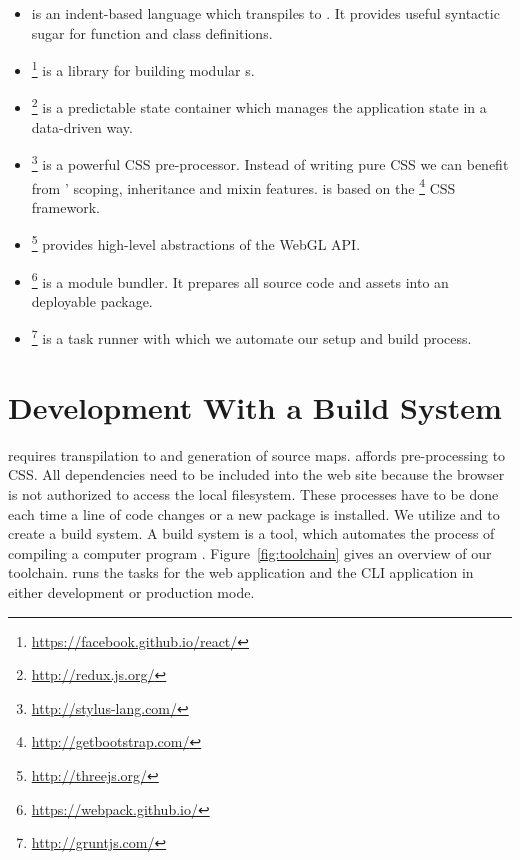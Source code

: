\documentclass[../ClassicThesis.tex]{subfiles}
\begin{document}
\begin{itemize}
\item {\coffeescript} is an indent-based language which
  transpiles to {\javascript}. It provides useful syntactic
  sugar for function and class definitions.

\item
  \footnote{\url{https://facebook.github.io/react/}}
  is a {\javascript} library for building modular
  {\userinterface}s.

\item {}\footnote{\url{http://redux.js.org/}} is a
  predictable state container which manages the application
  state in a data-driven way.

\item {}\footnote{\url{http://stylus-lang.com/}}
  is a powerful CSS pre-processor. Instead of writing pure
  CSS we can benefit from ' scoping,
  inheritance and mixin features. {\platener} is based on
  the
  \footnote{\url{http://getbootstrap.com/}}
  CSS framework.

\item \name{\threejs}\footnote{\url{http://threejs.org/}}
  provides high-level abstractions of the WebGL API.

\item
  \footnote{\url{https://webpack.github.io/}}
  is a module bundler. It prepares all source code and
  assets into an deployable package.

\item {}\footnote{\url{http://gruntjs.com/}} is a
  {\javascript} task runner with which we automate our setup
  and build process.
\end{itemize}

\section{Development With a Build System}

{\coffeescript} requires transpilation to {\javascript} and
generation of source maps.  affords
pre-processing to CSS. All dependencies need to be included
into the web site because the browser is not authorized to
access the local filesystem. These processes have to be done
each time a line of code changes or a new package is
installed. We utilize  and  to
create a build system. A build system is a tool, which
automates the process of compiling a computer program
\cite{build-system}. Figure~\ref{fig:toolchain} gives an
overview of our toolchain.  runs the
 tasks for the web application and the CLI
application in either development or production mode.
\end{document}
